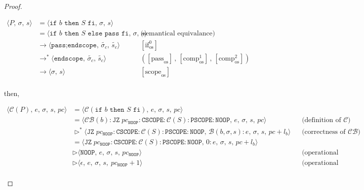 \documentclass{article}
\begin{document}
\begin{proof}
\begin{itemize}
\begin{itemize}
                \[
                  \begin{aligned}
                  \langle P,\, \sigma,\, s \rangle
                  &=\langle \texttt{if } b \texttt{ then } S \texttt{ fi},\, \sigma,\, s \rangle \\
                  &=\langle \texttt{if } b \texttt{ then } S \texttt{ else pass fi},\, \sigma,\, s \rangle 
                  && \text{(semantical equivalance)}\\
                  &\rightarrow \langle \texttt{pass;endscope},\, \tilde{\sigma_c} ,\, \tilde{s_c} \rangle
                  && [\text{if}^0_{\text{os}}]   \\
                  &\rightarrow^\ast \langle \texttt{endscope},\, \tilde{\sigma_c} ,\, \tilde{s_c} \rangle 
                  && ([\text{pass}_{\text{os}}] \,,\, [\text{comp}^1_{\text{os}}] \,,\, [\text{comp}^2_{\text{os}}])   \\
                  &\rightarrow \langle \sigma ,\, s \rangle
                  && [\text{scope}_{\text{os}}]   \\
                  \end{aligned}
              \]

            then,

            \[
              \begin{aligned}
              \langle \mathcal{C}(P),\, e,\, \sigma,\, s,\, pc \rangle
              &= \langle \mathcal{C}(\texttt{if } b \texttt{ then } S \texttt{ fi}),\, e,\, \sigma,\, s,\, pc \rangle \\
              &= \langle \mathcal{CB}(b) : \texttt{JZ}\; pc_{\texttt{NOOP}} : \texttt{CSCOPE} : \mathcal{C}(S) : \texttt{PSCOPE} :\texttt{NOOP} ,\, e,\, \sigma,\, s,\, pc \rangle
              && \text{(definition of } \mathcal{C}\text{)} \\   
              &\triangleright^\ast \langle \texttt{JZ}\; pc_{\texttt{NOOP}} : \texttt{CSCOPE} : \mathcal{C}(S) : \texttt{PSCOPE} :\texttt{NOOP} ,\, \mathcal{B}(b, \sigma, s) : e,\, \sigma,\, s,\, pc + l_b \rangle
              && \text{(correctness of } \mathcal{CB}\text{)} \\ 
              &= \langle \texttt{JZ}\; pc_{\texttt{NOOP}} : \texttt{CSCOPE} : \mathcal{C}(S) : \texttt{PSCOPE} :\texttt{NOOP} ,\, 0 : e,\, \sigma,\, s,\, pc + l_b \rangle \\  
              &\triangleright \langle \texttt{NOOP} ,\, e,\, \sigma,\, s,\, pc_{\texttt{NOOP}} \rangle
              && \text{(operational semantics)} \\
              &\triangleright \langle \epsilon ,\, e,\, \sigma,\, s,\ pc_{\texttt{NOOP}} + 1 \rangle
              && \text{(operational semantics)} \\ 
              \end{aligned}
          \]
                

\end{itemize}
\end{itemize}
\end{proof}
\end{document}
